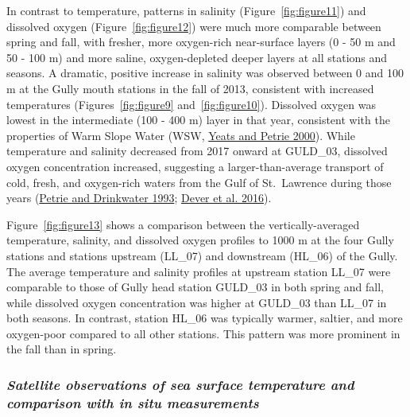\documentclass[12pt]{article}\usepackage[]{graphicx}\usepackage[]{color}
\begin{document}
In contrast to temperature, patterns in salinity (Figure~\ref{fig:figure11}) and dissolved oxygen (Figure~\ref{fig:figure12}) were much more comparable between spring and fall, with fresher, more oxygen-rich near-surface layers (0 - 50 m and 50 - 100 m) and more saline, oxygen-depleted deeper layers at all stations and seasons. A dramatic, positive increase in salinity was observed between 0 and 100 m at the Gully mouth stations in the fall of 2013, consistent with increased temperatures (Figures~\ref{fig:figure9} and~\ref{fig:figure10}). Dissolved oxygen was lowest in the intermediate (100 - 400 m) layer in that year, consistent with the properties of Warm Slope Water (WSW, \protect\hyperlink{ref-yeats_2000}{Yeats and Petrie 2000}). While temperature and salinity decreased from 2017 onward at GULD\_03, dissolved oxygen concentration increased, suggesting a larger-than-average transport of cold, fresh, and oxygen-rich waters from the Gulf of St.~Lawrence during those years (\protect\hyperlink{ref-petrie_1993}{Petrie and Drinkwater 1993}; \protect\hyperlink{ref-dever_2016}{Dever et al. 2016}).

Figure~\ref{fig:figure13} shows a comparison between the vertically-averaged temperature, salinity, and dissolved oxygen profiles to 1000 m at the four Gully stations and stations upstream (LL\_07) and downstream (HL\_06) of the Gully. The average temperature and salinity profiles at upstream station LL\_07 were comparable to those of Gully head station GULD\_03 in both spring and fall, while dissolved oxygen concentration was higher at GULD\_03 than LL\_07 in both seasons. In contrast, station HL\_06 was typically warmer, saltier, and more oxygen-poor compared to all other stations. This pattern was more prominent in the fall than in spring.

\hypertarget{satellite-observations-of-sea-surface-temperature-and-comparison-with-in-situ-measurements}{%
\subsubsection{\texorpdfstring{\emph{Satellite observations of sea surface temperature and comparison with in situ measurements}}{Satellite observations of sea surface temperature and comparison with in situ measurements}}\label{satellite-observations-of-sea-surface-temperature-and-comparison-with-in-situ-measurements}}
\end{document}
